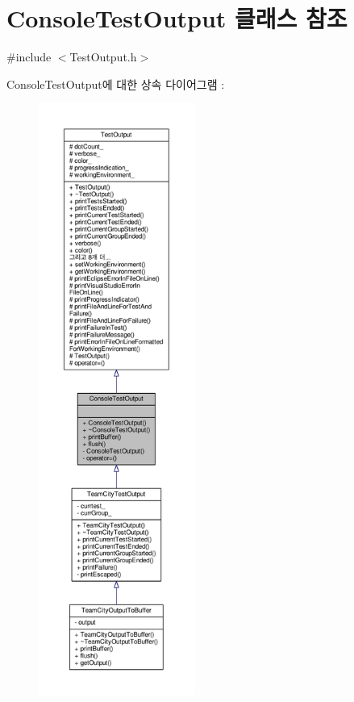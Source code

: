 \hypertarget{class_console_test_output}{}\section{Console\+Test\+Output 클래스 참조}
\label{class_console_test_output}


{\ttfamily \#include $<$Test\+Output.\+h$>$}



Console\+Test\+Output에 대한 상속 다이어그램 \+: 
\nopagebreak
\begin{figure}[H]
\begin{center}
\leavevmode
\includegraphics[height=550pt]{class_console_test_output__inherit__graph}
\end{center}
\end{figure}


